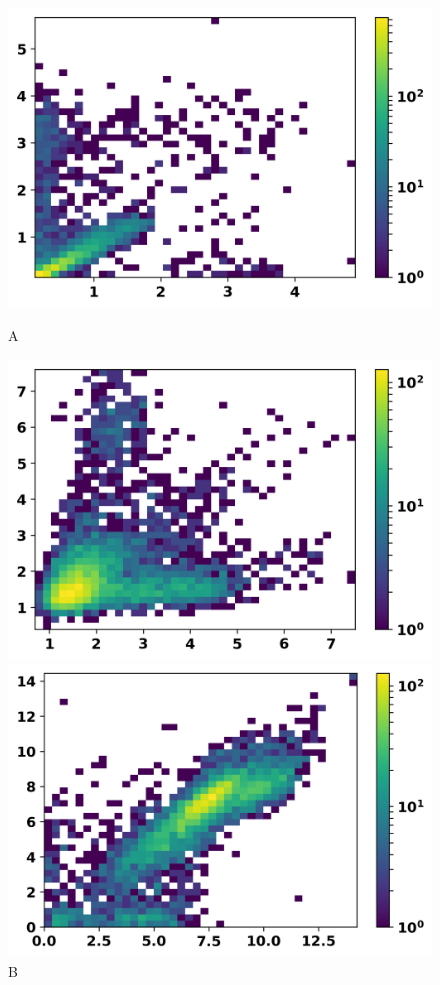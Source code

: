 \documentclass[11pt]{amsart}
\begin{document}
\begin{figure}[H]
\vspace{-\parskip}
  \includegraphics[clip,width=\textwidth]{act.png}
  \captionsetup{labelformat=empty}
  \caption{A}
\endminipage
{}
  \includegraphics[clip,width=\textwidth]{in_act.png}
  \captionsetup{labelformat=empty}
  \caption{B}
  \endminipage
  \includegraphics[clip,width=\textwidth]{t_rate.png}

\end{figure}
\end{document}

